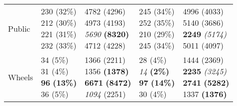 \documentclass[10pt]{article}
\begin{document}
\begin{table}
\begin{center}
\begin{small}
\begin{tabular}{lllll}
Public      &  \makecell[l]{\textnormal{230} \textnormal{(32\%)} \\\textnormal{212} \textnormal{(30\%)} \\\textnormal{221} \textnormal{(31\%)} \\\textnormal{232} \textnormal{(33\%)} \\}      &  \makecell[l]{\textnormal{4782} \textnormal{(4296)} \\\textnormal{4973} \textnormal{(4193)} \\\textit{5690} \textbf{(8320)} \\\textnormal{4712} \textnormal{(4228)} \\}      &  \makecell[l]{\textnormal{245} \textnormal{(34\%)} \\\textnormal{252} \textnormal{(35\%)} \\\textnormal{210} \textnormal{(29\%)} \\\textnormal{245} \textnormal{(34\%)} \\}      &  \makecell[l]{\textnormal{4996} \textnormal{(4033)} \\\textnormal{5140} \textnormal{(3686)} \\\textbf{2249} \textit{(5174)} \\\textnormal{5011} \textnormal{(4097)} \\} \\ \cline{2-5}
Wheels      &  \makecell[l]{\textnormal{34} \textnormal{(5\%)} \\\textnormal{31} \textnormal{(4\%)} \\\textbf{96} \textbf{(13\%)} \\\textnormal{36} \textnormal{(5\%)} \\}      &  \makecell[l]{\textnormal{1366} \textnormal{(2211)} \\\textnormal{1356} \textbf{(1378)} \\\textbf{6671} \textbf{(8472)} \\\textit{1094} \textnormal{(2251)} \\}      &  \makecell[l]{\textnormal{28} \textnormal{(4\%)} \\\textit{14} \textbf{(2\%)} \\\textbf{97} \textbf{(14\%)} \\\textnormal{30} \textnormal{(4\%)} \\}      &  \makecell[l]{\textnormal{1444} \textnormal{(2369)} \\\textbf{2235} \textit{(3245)} \\\textbf{2741} \textbf{(5282)} \\\textnormal{1337} \textbf{(1376)} \\} \\ \cline{2-5}

\end{tabular}
\end{small}
\end{center}
\end{table}
\end{document}
